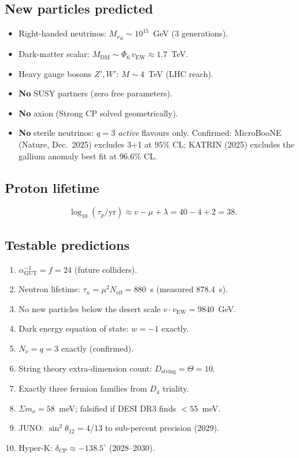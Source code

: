 \documentclass[12pt,a4paper]{article}
\theoremstyle{definition}
\newcommand{\Phisix}{\Phi_6}
\newcommand{\Neff}{N_{\mathrm{eff}}}
\newcommand{\vEW}{v_{\mathrm{EW}}}
\begin{document}
\subsection{New particles predicted}

\begin{itemize}[nosep]
\item Right-handed neutrinos: $M_{\nu_R}\sim 10^{15}$~GeV (3 generations).
\item Dark-matter scalar: $M_{\mathrm{DM}}\sim\Phisix\,\vEW\approx 1.7$~TeV.
\item Heavy gauge bosons $Z',W'$: $M\sim 4$~TeV (LHC reach).
\item \textbf{No} SUSY partners (zero free parameters).
\item \textbf{No} axion (Strong CP solved geometrically).
\item \textbf{No} sterile neutrinos: $q=3$ \emph{active} flavours only.
  Confirmed: MicroBooNE (Nature, Dec.\ 2025) excludes 3+1 at $95\%$ CL;
  KATRIN (2025) excludes the gallium anomaly best fit at $96.6\%$ CL.
\end{itemize}

\subsection{Proton lifetime}

\begin{equation}
  \log_{10}(\tau_p/\text{yr}) \approx v-\mu+\lambda = 40-4+2 = 38.
\end{equation}

\subsection{Testable predictions}

\begin{enumerate}[label=\textbf{P\arabic*.}]
\item $\alpha_{\mathrm{GUT}}^{-1} = f = 24$ (future colliders).
\item Neutron lifetime: $\tau_n = \mu^2\Neff = 880$~s (measured $878.4$~s).
\item No new particles below the desert scale $v\cdot\vEW = 9840$~GeV.
\item Dark energy equation of state: $w=-1$ exactly.
\item $N_\nu = q = 3$ exactly (confirmed).
\item String theory extra-dimension count: $D_{\text{string}}=\Theta=10$.
\item Exactly three fermion families from $D_4$ triality.
\item $\Sigma m_\nu = 58$~meV; falsified if DESI DR3 finds $<55$~meV.
\item JUNO: $\sin^2\theta_{12}=4/13$ to sub-percent precision (2029).
\item Hyper-K: $\delta_{\mathrm{CP}}\approx -138.5^\circ$ (2028--2030).
\end{enumerate}
\end{document}
